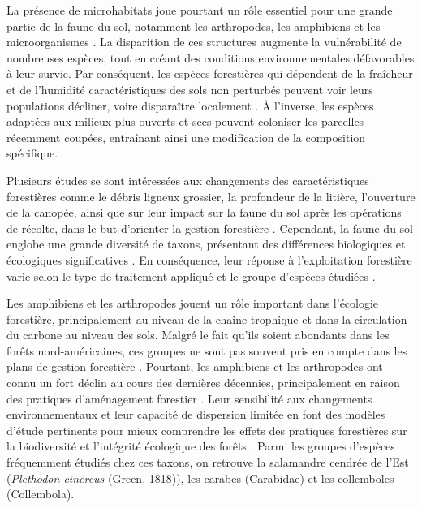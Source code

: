 La présence de microhabitats joue pourtant un rôle essentiel pour une grande partie de la faune du sol, notamment les arthropodes, les amphibiens et les microorganismes \citep{Paillet2010Biodiversitydifferences,Fedrowitz2014Canretention,Chaudhary2016Impactforest}. 
La disparition de ces structures augmente la vulnérabilité de nombreuses espèces, tout en créant des conditions environnementales défavorables à leur survie. 
Par conséquent, les espèces forestières qui dépendent de la fraîcheur et de l'humidité caractéristiques des sols non perturbés peuvent voir leurs populations décliner, voire disparaître localement \citep{Kudrin2023metaanalysiseffects}. 
À l'inverse, les espèces adaptées aux milieux plus ouverts et secs peuvent coloniser les parcelles récemment coupées, entraînant ainsi une modification de la composition spécifique. 

Plusieurs études se sont intéressées aux changements des caractéristiques forestières comme le débris ligneux grossier, la profondeur de la litière, l'ouverture de la canopée, 
ainsi que sur leur impact sur la faune du sol après les opérations de récolte, dans le but d'orienter la gestion forestière \citep{Semlitsch2002CriticalElements,McKenny2006Effectsstructural}. 
Cependant, la faune du sol englobe une grande diversité de taxons, présentant des différences biologiques et écologiques significatives \citep{Kudrin2023metaanalysiseffects}. 
En conséquence, leur réponse à l'exploitation forestière varie selon le type de traitement appliqué et le groupe d'espèces étudiées \citep{Malmstrom2009Dynamicssoil,Paillet2010Biodiversitydifferences}. 

Les amphibiens et les arthropodes jouent un rôle important dans l'écologie forestière, principalement au niveau de la chaine trophique et dans la circulation du carbone au niveau des sols. 
Malgré le fait qu'ils soient abondants dans les forêts nord-américaines, ces groupes ne sont pas souvent pris en compte dans les plans de gestion forestière \citep{deMaynadier1995relationshipforest}. 
Pourtant, les amphibiens et les arthropodes ont connu un fort déclin au cours des dernières décennies, principalement en raison des pratiques d'aménagement forestier \citep{Houlahan2000Quantitativeevidence,Stuart2004Statustrends,Wagner2021Insectdecline}. 
Leur sensibilité aux changements environnementaux et leur capacité de dispersion limitée en font des modèles d'étude pertinents pour mieux comprendre les effets des pratiques forestières 
sur la biodiversité et l'intégrité écologique des forêts \citep{pongeVerticalDistributionCollembola2000,Ojala2001Dispersalmicroarthropods,birdChangesSoilLitter2004,Maleque2009Arthropodsbioindicators}. 
Parmi les groupes d'espèces fréquemment étudiés chez ces taxons, on retrouve la salamandre cendrée de l'Est (\textit{Plethodon cinereus} (Green, 1818)), les carabes (Carabidae) et les collemboles (Collembola). 

